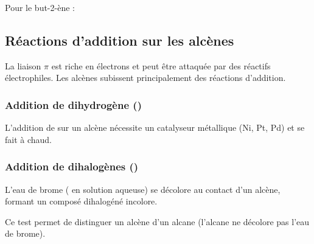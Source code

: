 \begin{exemple}
Pour le but-2-ène :
\begin{center}
\begin{illus}
\end{illus}
\qquad
\begin{illus}
\end{illus}
\end{center}
\end{exemple}

\subsection{Réactions d'addition sur les alcènes}

\begin{propriete}
La liaison $\pi$ est riche en électrons et peut être attaquée par des réactifs électrophiles. Les alcènes subissent principalement des réactions d'addition.
\end{propriete}

\subsubsection{Addition de dihydrogène ()}

\begin{experience}
L'addition de  sur un alcène nécessite un catalyseur métallique (Ni, Pt, Pd) et se fait à chaud.
\end{experience}

\subsubsection{Addition de dihalogènes ()}

\begin{experience}
L'eau de brome ( en solution aqueuse) se décolore au contact d'un alcène, formant un composé dihalogéné incolore.
\end{experience}

\begin{remarque}
Ce test permet de distinguer un alcène d'un alcane (l'alcane ne décolore pas l'eau de brome).
\end{remarque}


